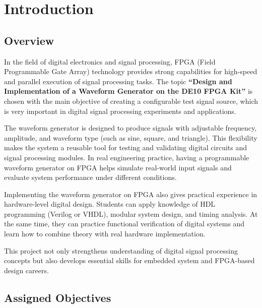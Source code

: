 \section{Introduction}

\subsection{Overview}

In the field of digital electronics and signal processing, FPGA (Field Programmable Gate Array) technology provides strong capabilities for high-speed and parallel execution of signal processing tasks. The topic\textbf{ “Design and Implementation of a Waveform Generator on the DE10 FPGA Kit”} is chosen with the main objective of creating a configurable test signal source, which is very important in digital signal processing experiments and applications.

The waveform generator is designed to produce signals with adjustable frequency, amplitude, and waveform type (such as sine, square, and triangle). This flexibility makes the system a reusable tool for testing and validating digital circuits and signal processing modules. In real engineering practice, having a programmable waveform generator on FPGA helps simulate real-world input signals and evaluate system performance under different conditions.

Implementing the waveform generator on FPGA also gives practical experience in hardware-level digital design. Students can apply knowledge of HDL programming (Verilog or VHDL), modular system design, and timing analysis. At the same time, they can practice functional verification of digital systems and learn how to combine theory with real hardware implementation.

This project not only strengthens understanding of digital signal processing concepts but also develops essential skills for embedded system and FPGA-based design careers.

\subsection{Assigned Objectives}

